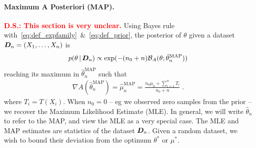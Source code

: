 \documentclass[twoside]{article}
\newcommand{\cond}{\,\vert\,}
\newcommand{\logpart}{A}
\newcommand{\bregman}{\cB_\logpart}
\newcommand{\nat}{\theta}
\newcommand{\m}{\mu}
\newcommand{\meanp}{\m}
\newcommand{\MAPm}{\hat \m_n}
\newcommand{\MAPt}{\hat \nat_n}
\begin{document}
\paragraph{Maximum A Posteriori (MAP).} 
\textcolor{red}{\textbf{D.S.: This section is very unclear. }}
Using Bayes rule with~\eqref{eq:def_expfamily}~\&~\eqref{eq:def_prior}, the posterior of $\nat$ given a dataset ${\bm{D}}_n =(X_1,\dots,X_n)$ is
\begin{align}
	p(\nat \cond \mD_n)
    \propto \exp(- (n_0+n) \bregman(\nat; \MAPt^\text{MAP}))
    \label{eq:joint_likelihood}
\end{align}
reaching its maximum in $\MAPt^\text{MAP}$ such that
\begin{align}
    \nabla \logpart(\MAPt^\text{MAP}) = \MAPm^\text{MAP}
    = \frac{n_0 \meanp_0 + \sum_{i=1}^n T_i}{n_0+n} \; .
\end{align}
where $T_i=T(X_i)$.
When $n_0=0$ -- eg we observed zero samples from the prior -- we recover the Maximum Likelihood Estimate (MLE).
In general, we will write $\MAPt$ to refer to the MAP, and view the MLE as a very special case.
The MLE and MAP estimates are statistics of the dataset ${\bm{D}}_n$.
Given a random dataset, we wish to bound their deviation from the optimum $\nat^*$ or $\meanp^*$.
\end{document}

